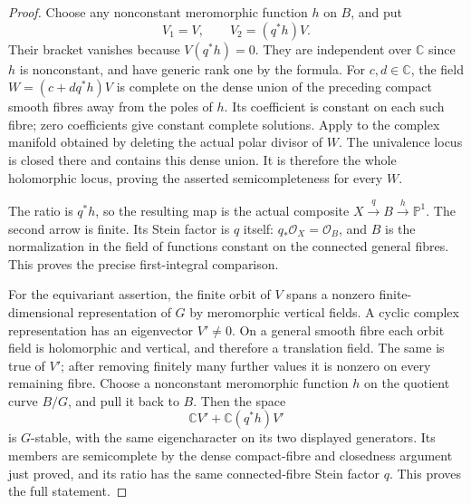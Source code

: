 \begin{proof}
Choose any nonconstant meromorphic function
$h$ on $B$, and put
\[
              V_1=V,\qquad V_2=(q^*h)V.
                                                               \tag{C.FL.4}\label{cdp:eq:C.FL.4}
\]
Their bracket vanishes because $V(q^*h)=0$.
They are independent over $\mathbb C$ since $h$
is nonconstant, and have generic rank one by
the formula. For $c,d\in\mathbb C$, the field
$W=(c+dq^*h)V$ is complete on the dense union
of the preceding compact smooth fibres away
from the poles of $h$. Its coefficient is
constant on each such fibre; zero coefficients
give constant complete solutions. Apply
\cite[Theorem~3.3]{Guillot2024} to the complex
manifold obtained by deleting the actual polar
divisor of $W$. The univalence locus is closed
there and contains this dense union. It is
therefore the whole holomorphic locus, proving
the asserted semicompleteness for every $W$.

The ratio is $q^*h$, so the resulting map is
the actual composite $X\xrightarrow q B
\xrightarrow h\mathbb P^1$. The second arrow
is finite. Its Stein factor is $q$ itself:
$q_*\mathcal O_X=\mathcal O_B$, and $B$ is
the normalization in the field of functions
constant on the connected general fibres.
This proves the precise first-integral comparison.

For the equivariant assertion, the finite orbit
of $V$ spans a nonzero finite-dimensional
representation of $G$ by meromorphic vertical
fields. A cyclic complex representation has
an eigenvector $V'\ne0$. On a general smooth
fibre each orbit field is holomorphic and
vertical, and therefore a translation field.
The same is true of $V'$; after removing
finitely many further values it is nonzero
on every remaining fibre. Choose a nonconstant
meromorphic function $h$ on the quotient
curve $B/G$, and pull it back to $B$.
Then the space
\[
                  \mathbb C V'+\mathbb C(q^*h)V'
                                                               \tag{C.FL.5}\label{cdp:eq:C.FL.5}
\]
is $G$-stable, with the same eigencharacter
on its two displayed generators. Its members
are semicomplete by the dense compact-fibre
and closedness argument just proved, and its
ratio has the same connected-fibre Stein
factor $q$. This proves the full statement.
\end{proof}


